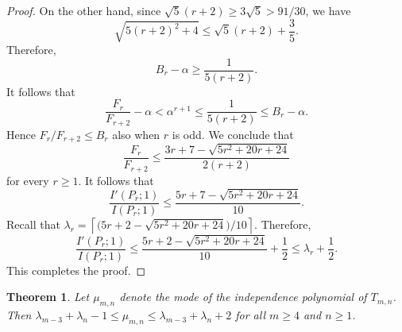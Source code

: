\documentclass[12pt,twoside]{amsart}
\newtheorem{theorem}[thm]{Theorem}
\theoremstyle{definition}
\theoremstyle{mystyle}
\begin{document}
\begin{proof}
On the other hand, since
$\sqrt5(r+2)\geq3\sqrt5>91/30$, we have
\[
\sqrt{5(r+2)^2+4}
\leq
\sqrt5(r+2)+\frac35.
\]
Therefore,
\[
B_r-\alpha
\geq
\frac{1}{5(r+2)}.
\]
It follows that
\[
\frac{F_r}{F_{r+2}}-\alpha
<
\alpha^{r+1}
\leq
\frac{1}{5(r+2)}
\leq
B_r-\alpha.
\]
Hence $F_r/F_{r+2}\leq B_r$ also when $r$ is odd. We conclude that
\[
\frac{F_r}{F_{r+2}}
\leq
\frac{3r+7-\sqrt{5r^2+20r+24}}{2(r+2)}
\]
for every $r\geq1$.
It follows that
\[
\frac{I'(P_r;1)}{I(P_r;1)}
\leq
\frac{5r+7-\sqrt{5r^2+20r+24}}{10}.
\]
Recall that
$\lambda_r=\left\lceil
\bigl(5r+2-\sqrt{5r^2+20r+24}\bigr)/10
\right\rceil$. Therefore,
\[
\frac{I'(P_r;1)}{I(P_r;1)}
\leq
\frac{5r+2-\sqrt{5r^2+20r+24}}{10}
+\frac12
\leq
\lambda_r+\frac12.
\]
This completes the proof.
\end{proof}

\begin{theorem}\label{thm:mode_tadpole}
Let $\mu_{m,n}$ denote the mode of the independence polynomial of
$T_{m,n}$. Then
$\lambda_{m-3}+\lambda_n-1\leq\mu_{m,n}
\leq\lambda_{m-3}+\lambda_n+2$
for all $m\geq4$ and $n\geq1$.
\end{theorem}
\end{document}
